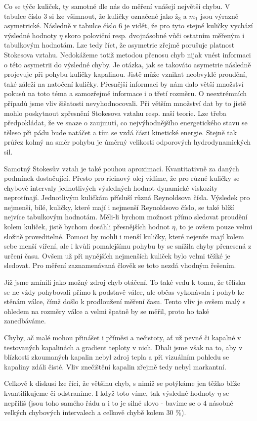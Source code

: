 \documentclass[a4paper]{article}
\begin{document}
\par Co se týče kuliček, ty samotné dle nás do měření vnášejí největší chybu. V tabulce číslo 3 si lze všimnout, že kuličky označené jako $\textit{ž}_{3}$ a $m_{1}$ jsou výrazně asymetrické. Následně v tabulce číslo 6 je vidět, že pro tyto stejné kuličky vychází výsledné hodnoty $\eta$ skoro poloviční resp. dvojnásobné vůči ostatním měřeným i tabulkovým hodnotám. Lze tedy říct, že asymetrie zřejmě porušuje platnost Stokesova vztahu. Nedokážeme totiž metodou přenosu chyb nijak vnést informaci o této asymetrii do výsledné chyby. Je otázka, jak se takováto asymetrie následně projevuje při pohybu kuličky kapalinou. Jistě může vznikat neobvyklé proudění, také záleží na natočení kuličky. Přesnější informaci by nám dalo větší množství pokusů na toto téma a samozřejmě informace i o třetí rozměru. O neextrémních případů jsme vliv šišatosti nevyhodnocovali. Při větším množství dat by to jistě mohlo poskytnout zpřesnění Stokesova vztahu resp. naší teorie. Lze třeba předpokládat, že ve snaze o zaujmutí, co nejvýhodnějšího energetického stavu se těleso při pádu bude natáčet a tím se vzdá části kinetické energie. Stejně tak průřez kolmý na směr pohybu je úměrný velikosti odporových hydrodynamických sil.
\par Samotný Stokesův vztah je také pouhou aproximací. Kvantitativně za daných podmínek dostačující. Přesto pro ricinový olej vidíme, že pro různé kuličky se chybové intervaly jednotlivých výsledných hodnot dynamické viskozity neprotínají. Jednotlivým kuličkám přísluší různá Reynoldsova čísla. Výsledek pro nejmenší, bílé, kuličky, které mají i nejmenší Reynoldsovo číslo, se také blíží nejvíce tabulkovým hodnotám. Měli-li bychom možnost přímo sledovat proudění kolem kuliček, jistě bychom dosáhli přesnějších hodnot $\eta$, to je ovšem pouze velmi složitě proveditelné. Pomoci by mohli i menší kuličky, které nejenže mají kolem sebe menší víření, ale i kvůli pomalejšímu pohybu by se snížila chyby přenesená z určení času. Ovšem už při nynějších nejmenších kuliček bylo velmi těžké je sledovat. Pro měření zaznamenávaná člověk se toto nezdá vhodným řešením.
\par Již jsme zmínili jako možný zdroj chyb otáčení. To také vedu k tomu, že tělíska se ne vždy pohybovali přímo k podstavě válce, ale občas vykonávala i pohyb ke stěnám válce, čímž došlo k prodloužení měření času. Tento vliv je ovšem malý s ohledem na rozměry válce a velmi špatně by se měřil, proto ho také zanedbáváme.
\par Chyby, ač malé mohou přinášet i příměsi a nečistoty, ať už pevné či kapalné v testovaných kapalinách a gradient teploty v nich. Dbali jsme však na to, aby v blízkosti zkoumaných kapalin nebyl zdroj tepla a při vizuálním pohledu se kapaliny zdáli čisté. Vliv znečištění kapalin zřejmě tedy nebyl markantní.
\par Celkově k diskusi lze říci, že většinu chyb, s nimiž se potýkáme jen těžko blíže kvantifikujeme či odstraníme. I když toto víme, tak výsledné hodnoty $\eta$ se nepříliš (jsou toho samého řádu a i to je silné slovo - bavíme se o 4 násobně velkých chybových intervalech a celkově chybě kolem 30 $\%$).
\end{document}
